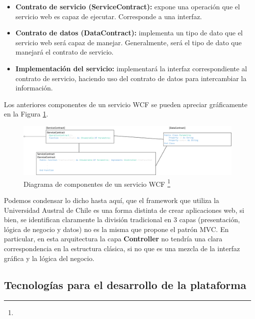 \begin{itemize}
	
	\item \textbf{Contrato de servicio (ServiceContract):} expone una operación que el servicio web es capaz de ejecutar. Corresponde a una interfaz.
	
	\item \textbf{ Contrato de datos (DataContract):} implementa un tipo de dato que el servicio web será capaz de manejar. Generalmente, será el tipo de dato que manejará el contrato de servicio.
	
	\item \textbf{Implementación del servicio:} implementará la interfaz correspondiente al contrato de servicio, haciendo uso del contrato de datos para intercambiar la información.
	
\end{itemize}
 
 Los anteriores componentes de un servicio WCF se pueden apreciar gráficamente en la Figura \ref{FiguraWCF}.
 
 	\begin{figure}[H]
 		\centering
 		\includegraphics[width=1\textwidth]{images/Capitulo_2/WFC.png}
 		\caption[Diagrama de componentes de un servicio WCF]{Diagrama de componentes de un servicio WCF \footnote{}}
 		\label{FiguraWCF}
 	\end{figure}

Podemos condensar lo dicho hasta aquí, que el framework que utiliza la Universidad Austral de Chile es una forma distinta de crear aplicaciones web, si bien, se identifican claramente  la división tradicional en 3 capas (presentación, lógica de negocio y datos) no es la misma que propone el patrón MVC. En particular, en esta arquitectura  la capa \textbf{Controller} no tendría una clara correspondencia en la estructura clásica, si no que es  una mezcla de la interfaz gráfica y la lógica del negocio.

\subsection{Tecnologías para el desarrollo de la plataforma} \label{Tecnologias}

